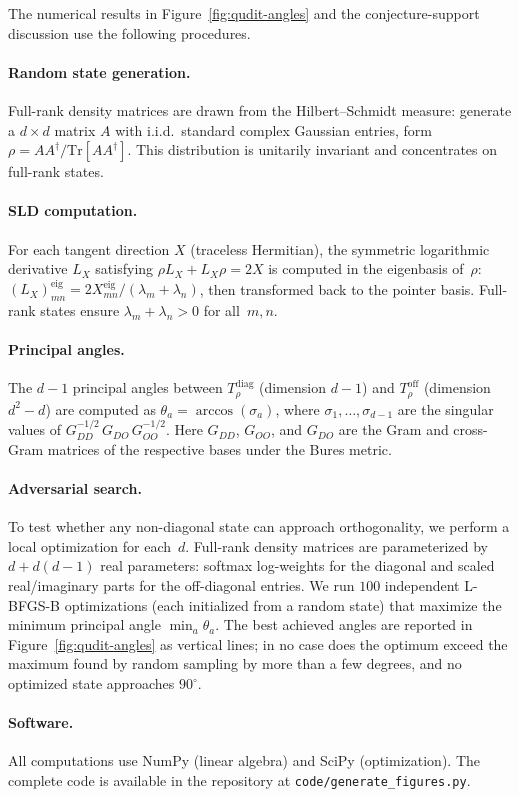 \documentclass[12pt,a4paper]{article}
\theoremstyle{definition}
\theoremstyle{remark}
\begin{document}
The numerical results in Figure~\ref{fig:qudit-angles} and the conjecture-support discussion use the following procedures.

\paragraph{Random state generation.}
Full-rank density matrices are drawn from the Hilbert--Schmidt measure: generate a $d \times d$ matrix $A$ with i.i.d.\ standard complex Gaussian entries, form $\rho = A A^\dagger / \mathrm{Tr}[A A^\dagger]$.  This distribution is unitarily invariant and concentrates on full-rank states.

\paragraph{SLD computation.}
For each tangent direction $X$ (traceless Hermitian), the symmetric logarithmic derivative $L_X$ satisfying $\rho L_X + L_X \rho = 2X$ is computed in the eigenbasis of~$\rho$: $(L_X)_{mn}^{\mathrm{eig}} = 2 X_{mn}^{\mathrm{eig}} / (\lambda_m + \lambda_n)$, then transformed back to the pointer basis.  Full-rank states ensure $\lambda_m + \lambda_n > 0$ for all~$m, n$.

\paragraph{Principal angles.}
The $d - 1$ principal angles between $T_\rho^{\mathrm{diag}}$ (dimension $d - 1$) and $T_\rho^{\mathrm{off}}$ (dimension $d^2 - d$) are computed as $\theta_a = \arccos(\sigma_a)$, where $\sigma_1, \ldots, \sigma_{d-1}$ are the singular values of $G_{DD}^{-1/2}\, G_{DO}\, G_{OO}^{-1/2}$.  Here $G_{DD}$, $G_{OO}$, and $G_{DO}$ are the Gram and cross-Gram matrices of the respective bases under the Bures metric.

\paragraph{Adversarial search.}
To test whether any non-diagonal state can approach orthogonality, we perform a local optimization for each~$d$.  Full-rank density matrices are parameterized by $d + d(d-1)$ real parameters: softmax log-weights for the diagonal and scaled real/imaginary parts for the off-diagonal entries.  We run $100$ independent L-BFGS-B optimizations (each initialized from a random state) that maximize the minimum principal angle $\min_a \theta_a$.  The best achieved angles are reported in Figure~\ref{fig:qudit-angles} as vertical lines; in no case does the optimum exceed the maximum found by random sampling by more than a few degrees, and no optimized state approaches $90^\circ$.

\paragraph{Software.}
All computations use NumPy (linear algebra) and SciPy (optimization).  The complete code is available in the repository at \texttt{code/generate\_figures.py}.
\end{document}
